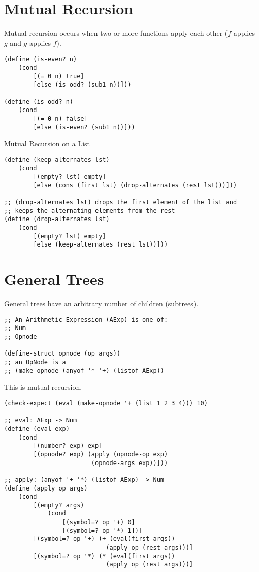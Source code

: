 \documentclass{article}
\begin{document}
\section{Mutual Recursion}

Mutual recursion occurs when two or more functions apply each other ($f$ applies $g$ and $g$ applies $f$). 

\begin{lstlisting}
(define (is-even? n)
    (cond
        [(= 0 n) true]
        [else (is-odd? (sub1 n))]))

(define (is-odd? n)
    (cond
        [(= 0 n) false]
        [else (is-even? (sub1 n))]))
\end{lstlisting}


\underline{Mutual Recursion on a List}

\begin{lstlisting}
(define (keep-alternates lst)
    (cond
        [(empty? lst) empty]
        [else (cons (first lst) (drop-alternates (rest lst)))]))

;; (drop-alternates lst) drops the first element of the list and 
;; keeps the alternating elements from the rest
(define (drop-alternates lst)
    (cond
        [(empty? lst) empty]
        [else (keep-alternates (rest lst))]))
\end{lstlisting}

\section{General Trees}

General trees have an arbitrary number of children (subtrees). 

\begin{lstlisting}
;; An Arithmetic Expression (AExp) is one of:
;; Num
;; Opnode

(define-struct opnode (op args))
;; an OpNode is a 
;; (make-opnode (anyof '* '+) (listof AExp))
\end{lstlisting}

This is mutual recursion. 

\begin{lstlisting}
(check-expect (eval (make-opnode '+ (list 1 2 3 4))) 10)

;; eval: AExp -> Num
(define (eval exp)
    (cond
        [(number? exp) exp]
        [(opnode? exp) (apply (opnode-op exp)
                        (opnode-args exp))]))

;; apply: (anyof '+ '*) (listof AExp) -> Num
(define (apply op args)
    (cond
        [(empty? args) 
            (cond
                [(symbol=? op '+) 0]
                [(symbol=? op '*) 1])]
        [(symbol=? op '+) (+ (eval(first args))
                            (apply op (rest args)))]
        [(symbol=? op '*) (* (eval(first args))
                            (apply op (rest args)))]
\end{lstlisting}
\end{document}
